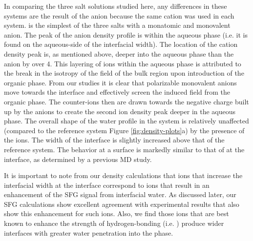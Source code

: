 In comparing the three salt solutions studied here, any differences in these systems are the result of the anion because the same cation was used in each system. \nacl is the simplest of the three salts with a monatomic and monovalent anion. The peak of the anion density profile is within the aqueous phase (i.e. it is found on the aqueous-side of the interfacial width). The location of the cation density peak is, as mentioned above, deeper into the aqueous phase than the anion by over 4\angs. This layering of ions within the aqueous phase is attributed to the break in the isotropy of the field of the bulk region upon introduction of the organic phase. From our studies it is clear that polarizable monovalent anions move towards the interface and effectively screen the induced field from the organic phase. The counter-ions then are drawn towards the negative charge built up by the anions to create the second ion density peak deeper in the aqueous phase. The overall shape of the water profile in the \nacl system is relatively unaffected (compared to the reference \ctcwat system Figure \ref{fig:density-plots}a) by the presence of the ions. The width of the interface is slightly increased above that of the reference system. The behavior at a \ctcwat surface is markedly similar to that of \nacl at the \airwat interface, as determined by a previous MD study.\cite{Wick2008a}


It is important to note from our density calculations that ions that increase the interfacial width at the \ctcwat interface correspond to ions that result in an enhancement of the SFG signal from interfacial water. As discussed later, our SFG calculations show excellent agreement with experimental results that also show this enhancement for such ions. Also, we find those ions that are best known to enhance the strength of hydrogen-bonding (i.e. \sul) produce wider interfaces with greater water penetration into the \ctc phase.

